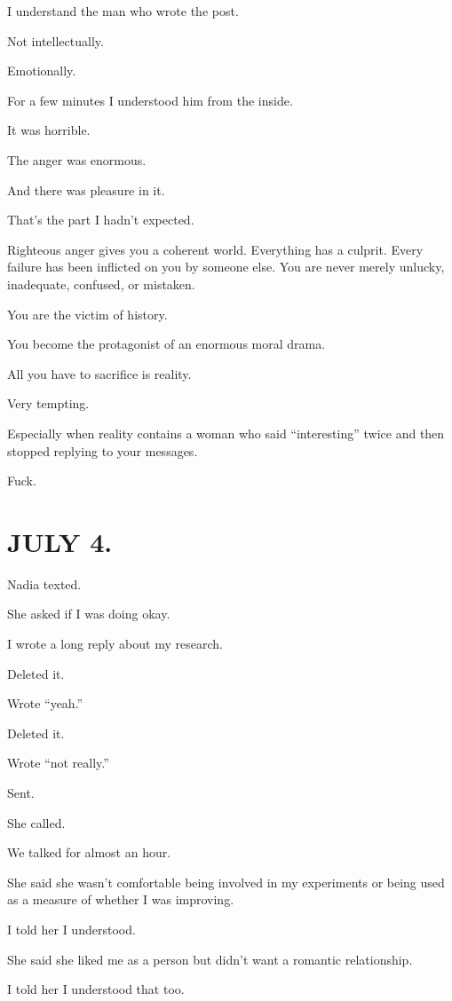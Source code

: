 \documentclass[11pt,oneside]{book}
\begin{document}
I understand the man who wrote the post.

Not intellectually.

Emotionally.

For a few minutes I understood him from the inside.

It was horrible.

The anger was enormous.

And there was pleasure in it.

That's the part I hadn't expected.

Righteous anger gives you a coherent world. Everything has a culprit. Every failure has been inflicted on you by someone else. You are never merely unlucky, inadequate, confused, or mistaken.

You are the victim of history.

You become the protagonist of an enormous moral drama.

All you have to sacrifice is reality.

Very tempting.

Especially when reality contains a woman who said ``interesting'' twice and then stopped replying to your messages.

Fuck.

\section*{JULY 4.}

Nadia texted.

She asked if I was doing okay.

I wrote a long reply about my research.

Deleted it.

Wrote ``yeah.''

Deleted it.

Wrote ``not really.''

Sent.

She called.

We talked for almost an hour.

She said she wasn't comfortable being involved in my experiments or being used as a measure of whether I was improving.

I told her I understood.

She said she liked me as a person but didn't want a romantic relationship.

I told her I understood that too.
\end{document}
